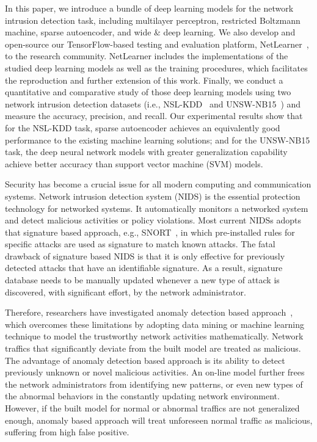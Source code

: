 In this paper, we introduce a bundle of deep learning models for the network intrusion detection task, including multilayer perceptron, restricted Boltzmann machine, sparse autoencoder, and wide \& deep learning. We also develop and open-source our TensorFlow-based testing and evaluation platform, NetLearner~\cite{NetLearner}, to the research community. NetLearner includes the implementations of the studied deep learning models as well as the training procedures, which facilitates the reproduction and further extension of this work. Finally, we conduct a quantitative and comparative study of those deep learning models using two network intrusion detection datasets (i.e., NSL-KDD~\cite{NSL-KDD} and UNSW-NB15~\cite{UNSW}) and measure the accuracy, precision, and recall.
Our experimental results show that for the NSL-KDD task, sparse autoencoder achieves an equivalently good performance to the existing machine learning solutions; and for the UNSW-NB15 task, the deep neural network models with greater generalization capability achieve better accuracy than support vector machine (SVM) models.

Security has become a crucial issue for all modern computing and communication systems.
Network intrusion detection system (NIDS) is the essential protection technology for networked systems.
It automatically monitors a networked system and detect malicious activities or policy violations.
Most current NIDSs adopts that signature based approach, e.g., SNORT~\cite{Snort}, in which
pre-installed rules for specific attacks are used as signature to match known attacks.
The fatal drawback of signature based NIDS is that
it is only effective for previously detected attacks that have an identifiable signature.
As a result, signature database needs to be manually updated whenever a new type of attack
is discovered, with significant effort, by the network administrator.

Therefore, researchers have investigated anomaly detection based approach~\cite{STL-NIDS, LOF, RankingOutliner, NB-Tree, RampLossKSVCR, GAA-ADS},
which overcomes these limitations by adopting data mining or machine learning technique to
model the trustworthy network activities mathematically.
Network traffics that significantly deviate from the built model are treated as malicious.
The advantage of anomaly detection based approach is its ability to detect previously unknown or novel malicious activities.
An on-line model further frees the network administrators from identifying new patterns,
or even new types of the abnormal behaviors in the constantly updating network environment.
However, if the built model for normal or abnormal traffics are not generalized enough,
anomaly based approach will treat unforeseen normal traffic as malicious,
suffering from high false positive.


